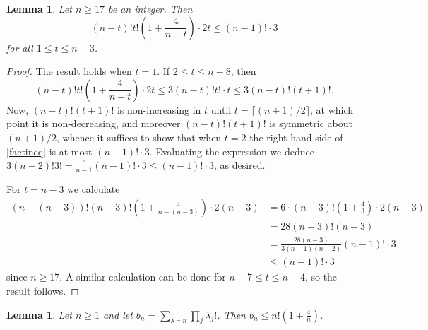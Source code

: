\documentclass{daj}
\theoremstyle{plain}
\newtheorem{lemma}[theorem]{Lemma}
\theoremstyle{definition}
\begin{document}
\begin{lemma}\label{prodmin}
Let $n\geq 17$ be an integer. Then $$(n-t)!t!\left(1+\frac{4}{n-t}\right)\cdot2t\leq (n-1)!\cdot 3$$ for all  $1\leq t\leq n-3$. 
\end{lemma}
\begin{proof}
The result holds when $t=1$.  If $2\leq t\leq n-8$, then \begin{equation}\label{factineq}(n-t)!t!\left(1+\frac{4}{n-t}\right)\cdot2t\leq3(n-t)!t!\cdot t\leq 3(n-t)!(t+1)!.\end{equation} Now, $(n-t)!(t+1)!$ is non-increasing in $t$ until $t=\lceil (n+1)/2\rceil$, at which point it is non-decreasing, and moreover $(n-t)!(t+1)!$ is symmetric about $(n+1)/2$, whence it suffices to show that when $t=2$ the right hand side of \eqref{factineq} is at most $(n-1)!\cdot 3$. Evaluating the expression we deduce $3(n-2)!3!=\frac{6}{n-1}(n-1)!\cdot 3\leq (n-1)!\cdot 3$, as desired.

For $t=n-3$ we calculate \begin{align*}(n-(n-3))!(n-3)!\left(1+\frac{4}{n-(n-3)}\right)\cdot2(n-3)&=6\cdot(n-3)!\left(1+\frac{4}{3}\right)\cdot 2(n-3)\\&=28(n-3)!(n-3)\\&=\frac{28(n-3)}{3(n-1)(n-2)}(n-1)!\cdot 3\\&\leq (n-1)!\cdot 3\end{align*} since $n\geq 17$. A similar calculation can be done for $n-7\leq t\leq n-4$, so the result follows.
\end{proof}
\begin{lemma}\label{comps}
Let $n\geq 1$ and let $b_n=\sum_{\lambda\vdash n}\prod_{j}\lambda_j!$. Then $b_n\leq n!\left(1+\frac{4}{n}\right)$.
\end{lemma}
\end{document}
